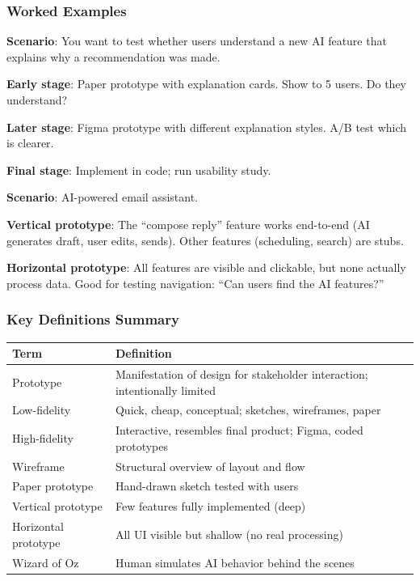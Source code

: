 \subsubsection*{Worked Examples}

\begin{exbox}
\textbf{Scenario}: You want to test whether users understand a new AI feature that explains why a recommendation was made.

\textbf{Early stage}: Paper prototype with explanation cards. Show to 5 users. Do they understand?

\textbf{Later stage}: Figma prototype with different explanation styles. A/B test which is clearer.

\textbf{Final stage}: Implement in code; run usability study.
\end{exbox}

\begin{exbox}
\textbf{Scenario}: AI-powered email assistant.

\textbf{Vertical prototype}: The ``compose reply'' feature works end-to-end (AI generates draft, user edits, sends). Other features (scheduling, search) are stubs.

\textbf{Horizontal prototype}: All features are visible and clickable, but none actually process data. Good for testing navigation: ``Can users find the AI features?''
\end{exbox}

\subsubsection*{Key Definitions Summary}

\begin{center}
\renewcommand{\arraystretch}{1.3}
\begin{tabular}{@{} l p{8cm} @{}}
\toprule
\textbf{Term} & \textbf{Definition} \\
\midrule
Prototype & Manifestation of design for stakeholder interaction; intentionally limited \\
Low-fidelity & Quick, cheap, conceptual; sketches, wireframes, paper \\
High-fidelity & Interactive, resembles final product; Figma, coded prototypes \\
Wireframe & Structural overview of layout and flow \\
Paper prototype & Hand-drawn sketch tested with users \\
Vertical prototype & Few features fully implemented (deep) \\
Horizontal prototype & All UI visible but shallow (no real processing) \\
Wizard of Oz & Human simulates AI behavior behind the scenes \\
\bottomrule
\end{tabular}
\end{center}

